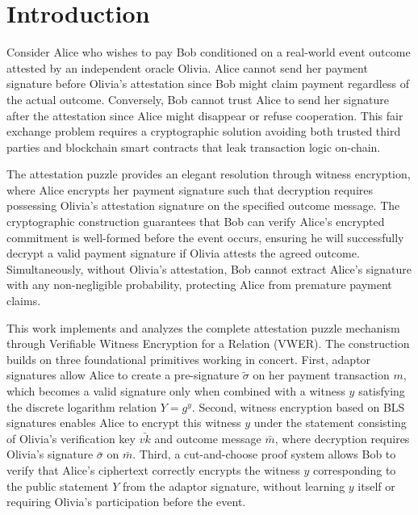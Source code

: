 \documentclass[11pt,a4paper]{article}
\begin{document}
{\begin{abstract}
\textbf{Keywords:} witness encryption, oracle attestations, BLS signatures, adaptor signatures, conditional payments, pairing-based cryptography
\end{abstract}

\section{Introduction}

Consider Alice who wishes to pay Bob conditioned on a real-world event outcome attested by an independent oracle Olivia. Alice cannot send her payment signature before Olivia's attestation since Bob might claim payment regardless of the actual outcome. Conversely, Bob cannot trust Alice to send her signature after the attestation since Alice might disappear or refuse cooperation. This fair exchange problem requires a cryptographic solution avoiding both trusted third parties and blockchain smart contracts that leak transaction logic on-chain.

The attestation puzzle provides an elegant resolution through witness encryption, where Alice encrypts her payment signature such that decryption requires possessing Olivia's attestation signature on the specified outcome message. The cryptographic construction guarantees that Bob can verify Alice's encrypted commitment is well-formed before the event occurs, ensuring he will successfully decrypt a valid payment signature if Olivia attests the agreed outcome. Simultaneously, without Olivia's attestation, Bob cannot extract Alice's signature with any non-negligible probability, protecting Alice from premature payment claims.

This work implements and analyzes the complete attestation puzzle mechanism through Verifiable Witness Encryption for a Relation (VWER). The construction builds on three foundational primitives working in concert. First, adaptor signatures allow Alice to create a pre-signature $\tilde{\sigma}$ on her payment transaction $m$, which becomes a valid signature only when combined with a witness $y$ satisfying the discrete logarithm relation $Y = g^y$. Second, witness encryption based on BLS signatures enables Alice to encrypt this witness $y$ under the statement consisting of Olivia's verification key $\bar{vk}$ and outcome message $\bar{m}$, where decryption requires Olivia's signature $\bar{\sigma}$ on $\bar{m}$. Third, a cut-and-choose proof system allows Bob to verify that Alice's ciphertext correctly encrypts the witness $y$ corresponding to the public statement $Y$ from the adaptor signature, without learning $y$ itself or requiring Olivia's participation before the event.

}
\end{document}
